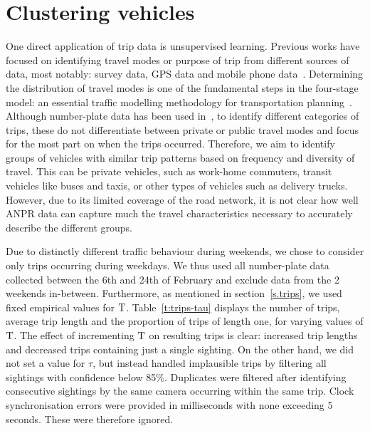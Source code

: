 \section{Clustering vehicles}\label{s.classification}

One direct application of trip data is unsupervised learning. Previous works have focused on identifying travel modes or purpose of trip from different sources of data, most notably: survey data, GPS data and mobile phone data~\cite{ODMobileData, ClusteringGPS}. Determining the distribution of travel modes is one of the fundamental steps in the four-stage model: an essential traffic modelling methodology for transportation planning~\cite{FourStepModel}. Although number-plate data has been used in~\cite{Clustering}, to identify different categories of trips, these do not differentiate between private or public travel modes and focus for the most part on when the trips occurred. Therefore, we aim to identify groups of vehicles with similar trip patterns based on frequency and diversity of travel. This can be private vehicles, such as work-home commuters, transit vehicles like buses and taxis, or other types of vehicles such as delivery trucks.
However, due to its limited coverage of the road network, it is not clear how well ANPR data can capture much the travel characteristics necessary to accurately describe the different groups.

Due to distinctly different traffic behaviour during weekends, we chose to consider only trips occurring during weekdays. We thus used all number-plate data collected between the 6th and 24th of February and exclude data from the 2 weekends in-between. Furthermore, as mentioned in section~\ref{s.trips}, we used fixed empirical values for $\mathrm{T}$. Table~\ref{t:trips-tau} displays the number of trips, average trip length and the proportion of trips of length one, for varying values of $\mathrm{T}$. The effect of incrementing $\mathrm{T}$ on resulting trips is clear: increased trip lengths and decreased trips containing just a single sighting. On the other hand, we did not set a value for $\tau$, but instead handled implausible trips by filtering all sightings with confidence below 85\%. Duplicates were filtered after identifying consecutive sightings by the same camera occurring within the same trip. Clock synchronisation errors were provided in milliseconds with none exceeding 5 seconds. These were therefore ignored.

